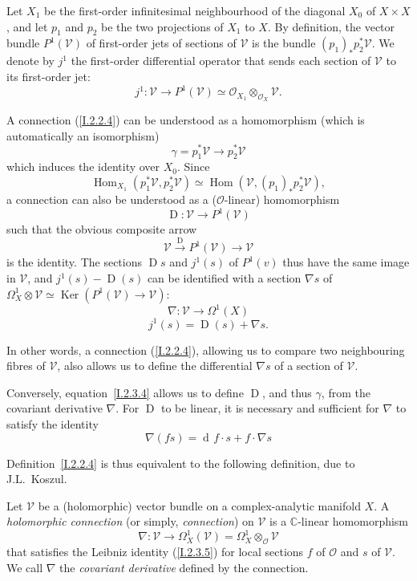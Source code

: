 \documentclass{report}
\theoremstyle{plain}
\theoremstyle{definition}
\newenvironment{definition}[1]
    {\renewcommand\theinnercustomdefinition{#1}\innercustomdefinition}
    {\endinnercustomdefinition}
\newenvironment{env}[1]
    {\renewcommand\theinnercustomenv{#1}\innercustomenv}
    {\endinnercustomenv}
\newcommand{\sh}{\mathscr}
\DeclareMathOperator{\Ker}{Ker}
\DeclareMathOperator{\Hom}{Hom}
\DeclareMathOperator{\DD}{D}
\DeclareMathOperator{\dd}{d\!}
\newcommand{\oldpage}[1]{\marginpar{\footnotesize$\Big\vert$ \textit{p.~#1}}}
\begin{document}
\begin{env}{2.3}
\label{I.2.3}
  Let $X_1$ be the first-order infinitesimal neighbourhood of the diagonal $X_0$ of $X\times X$, and let $p_1$ and $p_2$ be the two projections of $X_1$ to $X$.
  By definition, the vector bundle $P^1(\sh{V})$ of first-order jets of sections of $\sh{V}$ is the bundle $(p_1)_*p_2^*\sh{V}$.
  We denote by $j^1$ the first-order differential operator that sends each section of $\sh{V}$ to its first-order jet:
  \[
    j^1\colon \sh{V} \to P^1(\sh{V}) \simeq \sh{O}_{X_1}\otimes_{\sh{O}_X}\sh{V}.
  \]

  A connection (\cref{I.2.2.4}) can be understood as a homomorphism (which is automatically an isomorphism)
  \[
  \label{I.2.3.1}
    \gamma = p_1^*\sh{V} \to p_2^*\sh{V}
  \tag{2.3.1}
  \]
  which induces the identity over $X_0$.
  Since
  \[
    \Hom_{X_1}(p_1^*\sh{V},p_2^*\sh{V}) \simeq \Hom(\sh{V},(p_1)_*p_2^*\sh{V}),
  \]
\oldpage{7}
  a connection can also be understood as a ($\sh{O}$-linear) homomorphism
  \[
  \label{I.2.3.2}
    \DD\colon \sh{V} \to P^1(\sh{V})
  \tag{2.3.2}
  \]
  such that the obvious composite arrow
  \[
    \sh{V}\xrightarrow{\DD} P^1(\sh{V}) \to \sh{V}
  \]
  is the identity.
  The sections $\DD s$ and $j^1(s)$ of $P^1(v)$ thus have the same image in $\sh{V}$, and $j^1(s)-\DD(s)$ can be identified with a section $\nabla s$ of $\Omega_X^1\otimes\sh{V} \simeq \Ker(P^1(\sh{V})\to\sh{V})$:
  \[
  \label{I.2.3.3}
    \nabla\colon \sh{V} \to \Omega^1(X)
  \tag{2.3.3}
  \]
  \[
  \label{I.2.3.4}
    j^1(s) = \DD(s)+\nabla s.
  \tag{2.3.4}
  \]

  In other words, a connection (\cref{I.2.2.4}), allowing us to compare two neighbouring fibres of $\sh{V}$, also allows us to define the differential $\nabla s$ of a section of $\sh{V}$.

  Conversely, equation~\cref{I.2.3.4} allows us to define $\DD$, and thus $\gamma$, from the covariant derivative $\nabla$.
  For $\DD$ to be linear, it is necessary and sufficient for $\nabla$ to satisfy the identity
  \[
  \label{I.2.3.5}
    \nabla(fs) = \dd f\cdot s + f\cdot\nabla s
  \tag{2.3.5}
  \]

  Definition~\cref{I.2.2.4} is thus equivalent to the following definition, due to J.L.~Koszul.
\end{env}

\begin{definition}{2.4}
\label{I.2.4}
  Let $\sh{V}$ be a (holomorphic) vector bundle on a complex-analytic manifold $X$.
  A \emph{holomorphic connection} (or simply, \emph{connection}) on $\sh{V}$ is a $\mathbb{C}$-linear homomorphism
  \[
    \nabla\colon \sh{V} \to \Omega_X^1(\sh{V}) = \Omega_X^1\otimes_{\sh{O}}\sh{V}
  \]
  that satisfies the Leibniz identity (\cref{I.2.3.5}) for local sections $f$ of $\sh{O}$ and $s$ of $\sh{V}$.
  We call $\nabla$ the \emph{covariant derivative} defined by the connection.
\end{definition}
\end{document}
